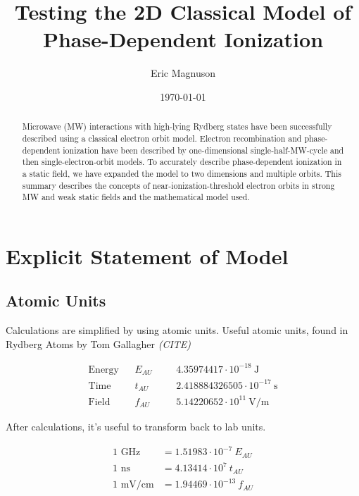 \documentclass[aps,pra,preprint,groupedaddress]{revtex4-1}
\begin{document}
\title{Testing the 2D Classical Model of Phase-Dependent Ionization}

\author{Eric Magnuson}
\date{\today}

\begin{abstract}
Microwave (MW) interactions with high-lying Rydberg states have been successfully described using a classical electron orbit model. Electron recombination and phase-dependent ionization have been described by one-dimensional single-half-MW-cycle and then single-electron-orbit models. To accurately describe phase-dependent ionization in a static field, we have expanded the model to two dimensions and multiple orbits. This summary describes the concepts of near-ionization-threshold electron orbits in strong MW and weak static fields and the mathematical model used.
\end{abstract}

\maketitle

\section{\label{sec:State} Explicit Statement of Model}

\subsection{\label{sec:AU} Atomic Units}

Calculations are simplified by using atomic units. Useful atomic units, found in Rydberg Atoms by Tom Gallagher \emph{(CITE)}

\begin{align*}
\text{Energy} & & E_{AU} & & & 4.35974417 \cdot 10^{-18} ~ \text{J} \\
\text{Time} & & t_{AU} & & & 2.418884326505 \cdot 10^{-17} ~ \text{s} \\
\text{Field} & & f_{AU} & & & 5.14220652 \cdot 10^{11} ~ \text{V/m}
\end{align*}

After calculations, it's useful to transform back to lab units.

\begin{align*}
\text{1 GHz} & = 1.51983 \cdot 10^{-7} ~ E_{AU} \\
\text{1 ns} & = 4.13414 \cdot 10^7 ~ t_{AU} \\
\text{1 mV/cm} & = 1.94469 \cdot 10^{-13} ~ f_{AU}
\end{align*}
\end{document}
